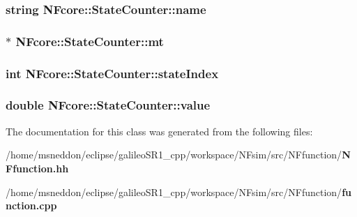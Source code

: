 \subsubsection{\setlength{\rightskip}{0pt plus 5cm}string {\bf NFcore::StateCounter::name}}\label{classNFcore_1_1StateCounter_f33e6c1ac6e69d74b24f6b9ca3238193}


\subsubsection{$\ast$ {\bf NFcore::StateCounter::mt}}\label{classNFcore_1_1StateCounter_415dd923cb75e9da42f3f5ca44bcee49}


\subsubsection{\setlength{\rightskip}{0pt plus 5cm}int {\bf NFcore::StateCounter::stateIndex}}\label{classNFcore_1_1StateCounter_0b039d4ee92aae9dd6b841f8cea13cd3}


\subsubsection{\setlength{\rightskip}{0pt plus 5cm}double {\bf NFcore::StateCounter::value}}\label{classNFcore_1_1StateCounter_c170ba269add82d4722bc386b3532bdb}




The documentation for this class was generated from the following files:\begin{CompactItemize}
\item 
/home/msneddon/eclipse/galileoSR1\_\-cpp/workspace/NFsim/src/NFfunction/{\bf NFfunction.hh}\item 
/home/msneddon/eclipse/galileoSR1\_\-cpp/workspace/NFsim/src/NFfunction/{\bf function.cpp}\end{CompactItemize}
